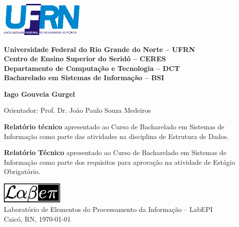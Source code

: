 \begin{titlepage}

\begin{center}

\small

\parbox{0.33\textwidth}{%
\includegraphics[width=0.31\textwidth]{image/ufrn.eps}}%
\parbox{0.67\textwidth}{%
\begin{center}%
\textbf{%
Universidade Federal do Rio Grande do Norte -- UFRN\\
Centro de Ensino Superior do Seridó -- CERES\\
Departamento de Computação e Tecnologia -- DCT\\
Bacharelado em Sistemas de Informação -- BSI}
\end{center}}

\vfill

\LARGE

\textbf{\titulo}

\vfill

\Large

\textbf{Iago Gouveia Gurgel}

\vfill

\normalsize

Orientador: Prof. Dr. João Paulo Souza Medeiros

\vfill

\hfill
\if\doctype\doctypem           %
\parbox{0.5\linewidth}{%
{\bf Relatório técnico} apresentado ao Curso de Bacharelado em Sistemas de
Informação como parte das atividades na disciplina de
Estrutura de Dados.}
\fi
\if\doctype\doctyper           %
\parbox{0.5\linewidth}{%
{\bf Relatório Técnico} apresentado ao Curso de Bacharelado em Sistemas de
Informação como parte dos requisitos para aprovação na atividade de Estágio
Obrigatório.}
\fi

\vfill

\large

\includegraphics[width=0.23\textwidth]{image/labepi.eps} \\
Laboratório de Elementos do Processamento da Informação -- LabEPI \\
Caicó, RN, \today

\end{center}

\end{titlepage}
